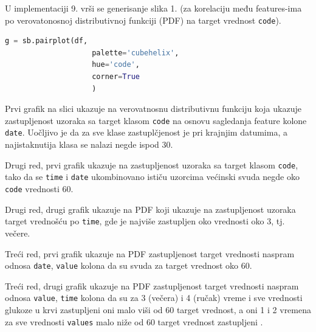 \documentclass[fontsize=12bp, paper=a4]{scrarticle}
\begin{document}

U implementaciji 9. vrši se generisanje slika 1. (za korelaciju među features-ima po verovatonosnoj distributivnoj funkciji (PDF) na target vrednost \verb|code|). 

\begin{lstlisting}[language=Python, caption=Iscrtavanje korelacija i distribucija]
    g = sb.pairplot(df, 
                    palette='cubehelix',
                    hue='code',
                    corner=True
                    )
\end{lstlisting}
\newpage

Prvi grafik na slici ukazuje na verovatnosnu distributivnu funkciju koja ukazuje zastupljenost uzoraka sa target klasom \verb|code| na osnovu sagledanja feature kolone \verb|date|. Uočljivo je da za sve klase zastuplčjenost je pri krajnjim datumima, a najistaknutija klasa se nalazi negde ispod 30.

Drugi red, prvi grafik ukazuje na zastupljenost uzoraka sa target klasom \verb|code|, tako da se \verb|time| i \verb|date| ukombinovano ističu uzorcima većinski svuda negde oko \verb|code| vrednosti 60.

Drugi red, drugi grafik ukazuje na PDF koji ukazuje na zastupljenost uzoraka target vrednošću po \verb|time|, gde je najviše zastupljen oko vrednosti oko 3, tj. večere.

Treći red, prvi grafik ukazuje na PDF zastupljenost target vrednosti naspram odnosa \verb|date|, \verb|value| kolona da su svuda za target vrednost oko 60.

Treći red, drugi grafik ukazuje na PDF zastupljenost target vrednosti naspram odnosa \verb|value|, \verb|time| kolona da su za 3 (večera) i 4 (ručak) vreme i sve vrednosti glukoze u krvi zastupljeni oni malo viši od 60 target vrednost, a oni 1 i 2 vremena za sve vrednosti \verb|values| malo niže od 60 target vrednost zastupljeni .
\end{document}
